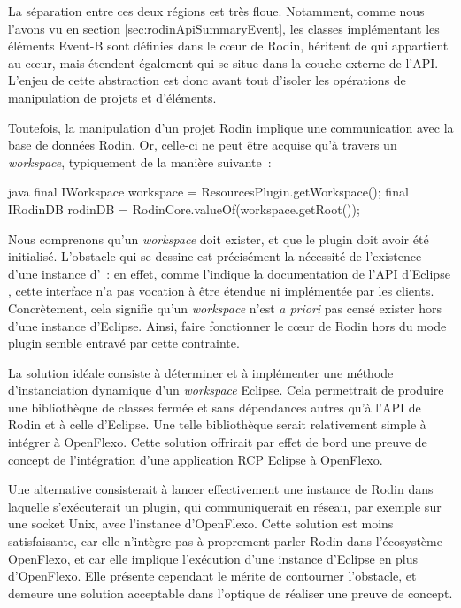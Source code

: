 La séparation entre ces deux régions est très floue.
Notamment, comme nous l'avons vu en section \ref{sec:rodinApiSummaryEvent}, les classes implémentant les éléments Event-B sont définies dans le cœur de Rodin, %
héritent de  qui appartient au cœur, mais étendent également  qui se situe dans la couche externe de l'API.
L'enjeu de cette abstraction est donc avant tout d'isoler les opérations de manipulation de projets et d'éléments.

Toutefois, la manipulation d'un projet Rodin implique une communication avec la base de données Rodin.
Or, celle-ci ne peut être acquise qu'à travers un \textit{workspace}, typiquement de la manière suivante~:

\begin{imtaCode}{java}
final IWorkspace workspace = ResourcesPlugin.getWorkspace();
final IRodinDB rodinDB = RodinCore.valueOf(workspace.getRoot());
\end{imtaCode}

Nous comprenons qu'un \textit{workspace} doit exister, et que le plugin  doit avoir été initialisé.
L'obstacle qui se dessine est précisément la nécessité de l'existence d'une instance d'~: en effet, comme l'indique la documentation %
de l'API d'Eclipse \cite{eclipseiworkspace}, cette interface n'a pas vocation à être étendue ni implémentée par les clients.
Concrètement, cela signifie qu'un \textit{workspace} n'est \textit{a priori} pas censé exister hors d'une instance d'Eclipse.
Ainsi, faire fonctionner le cœur de Rodin hors du mode plugin semble entravé par cette contrainte.

La solution idéale consiste à déterminer et à implémenter une méthode d'instanciation dynamique d'un \textit{workspace} Eclipse.
Cela permettrait de produire une bibliothèque de classes fermée et sans dépendances autres qu'à l'API de Rodin et à celle d'Eclipse.
Une telle bibliothèque serait relativement simple à intégrer à OpenFlexo.
Cette solution offrirait par effet de bord une preuve de concept de l'intégration d'une application RCP Eclipse à OpenFlexo.

Une alternative consisterait à lancer effectivement une instance de Rodin dans laquelle s'exécuterait un plugin, qui communiquerait %
en réseau, par exemple sur une socket Unix, avec l'instance d'OpenFlexo.
Cette solution est moins satisfaisante, car elle n'intègre pas à proprement parler Rodin dans l'écosystème OpenFlexo, et car elle implique l'exécution %
d'une instance d'Eclipse en plus d'OpenFlexo.
Elle présente cependant le mérite de contourner l'obstacle, et demeure une solution acceptable dans l'optique de réaliser une preuve de concept.


